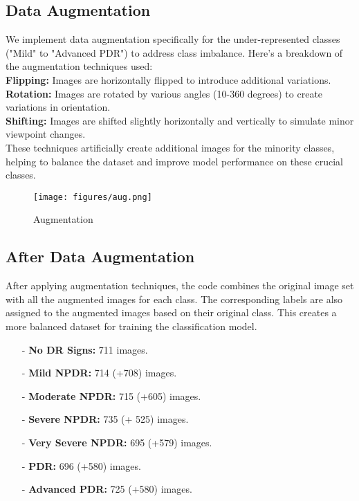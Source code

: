 \documentclass[conference]{IEEEtran}
\begin{document}
\subsection{Data Augmentation}

We implement data augmentation specifically for the under-represented classes ("Mild" to "Advanced PDR") to address class imbalance. Here's a breakdown of the augmentation techniques used:\\

\textbf{Flipping:} Images are horizontally flipped to introduce additional variations.\\

\textbf{Rotation:} Images are rotated by various angles (10-360 degrees) to create variations in orientation.\\

\textbf{Shifting:} Images are shifted slightly horizontally and vertically to simulate minor viewpoint changes.\\

These techniques artificially create additional images for the minority classes, helping to balance the dataset and improve model performance on these crucial classes.

\begin{figure}[h]
\centering
\texttt{[image: figures/aug.png]}
\caption{Augmentation}
\label{fig:augmentation}
\end{figure}

\subsection{After Data Augmentation}

After applying augmentation techniques, the code combines the original image set with all the augmented images for each class. The corresponding labels are also assigned to the augmented images based on their original class. This creates a more balanced dataset for training the classification model.\\

\begin{itemize}
    \item[-] \textbf{No DR Signs:} 711 images.
    \item[-] \textbf{Mild NPDR:} 714 (+708) images.
    \item[-] \textbf{Moderate NPDR:} 715 (+605) images.
    \item[-] \textbf{Severe NPDR:} 735 (+ 525) images.
    \item[-] \textbf{Very Severe NPDR:} 695 (+579) images.
    \item[-] \textbf{PDR:} 696 (+580) images.
    \item[-] \textbf{Advanced PDR:} 725 (+580) images.\\
\end{itemize}
\end{document}
